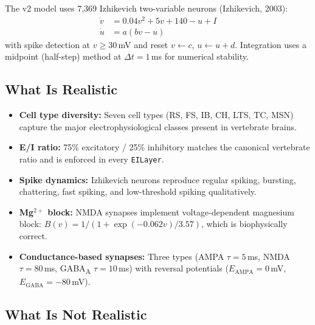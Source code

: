 \documentclass[11pt,a4paper]{article}
\begin{document}
The v2 model uses 7,369 Izhikevich two-variable neurons (Izhikevich, 2003):
\begin{align}
\dot{v} &= 0.04v^2 + 5v + 140 - u + I \label{eq:izh_v}\\
\dot{u} &= a(bv - u) \label{eq:izh_u}
\end{align}
with spike detection at $v \geq 30$\,mV and reset $v \leftarrow c$, $u \leftarrow u + d$.
Integration uses a midpoint (half-step) method at $\Delta t = 1$\,ms for numerical
stability.

\subsection{What Is Realistic}

\begin{itemize}[leftmargin=*]
\item \textbf{Cell type diversity:} Seven cell types (RS, FS, IB, CH, LTS, TC, MSN)
  capture the major electrophysiological classes present in vertebrate brains.
\item \textbf{E/I ratio:} 75\% excitatory / 25\% inhibitory matches the canonical
  vertebrate ratio and is enforced in every \texttt{EILayer}.
\item \textbf{Spike dynamics:} Izhikevich neurons reproduce regular spiking, bursting,
  chattering, fast spiking, and low-threshold spiking qualitatively.
\item \textbf{Mg$^{2+}$ block:} NMDA synapses implement voltage-dependent magnesium block:
  $B(v) = 1/(1 + \exp(-0.062v)/3.57)$, which is biophysically correct.
\item \textbf{Conductance-based synapses:} Three types (AMPA $\tau=5$\,ms,
  NMDA $\tau=80$\,ms, GABA\textsubscript{A} $\tau=10$\,ms) with reversal
  potentials ($E_\text{AMPA}=0$\,mV, $E_\text{GABA}=-80$\,mV).
\end{itemize}

\subsection{What Is Not Realistic}
\end{document}
